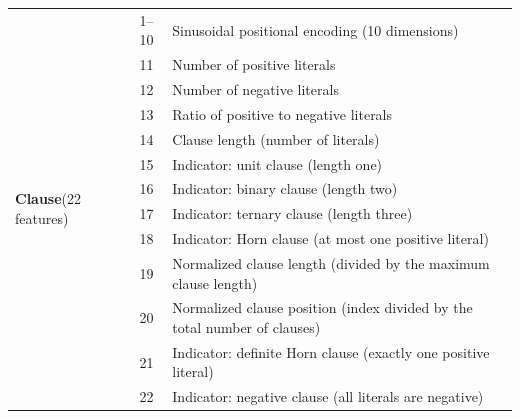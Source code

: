 \begin{table}[htbp]
{\begin{tabular}{@{} p{} c p{} @{}}
			\multirow{13}{=}{\textbf{Clause}\newline(22 features)}
			                   & 1--10         & Sinusoidal positional encoding (10 dimensions)                            \\
			                   & 11            & Number of positive literals                                               \\
			                   & 12            & Number of negative literals                                               \\
			                   & 13            & Ratio of positive to negative literals                                    \\
			                   & 14            & Clause length (number of literals)                                        \\
			                   & 15            & Indicator: unit clause (length one)                                       \\
			                   & 16            & Indicator: binary clause (length two)                                     \\
			                   & 17            & Indicator: ternary clause (length three)                                  \\
			                   & 18            & Indicator: Horn clause (at most one positive literal)                     \\
			                   & 19            & Normalized clause length (divided by the maximum clause length)           \\
			                   & 20            & Normalized clause position (index divided by the total number of clauses) \\
			                   & 21            & Indicator: definite Horn clause (exactly one positive literal)            \\
			                   & 22            & Indicator: negative clause (all literals are negative)                    \\
			\bottomrule
		\end{tabular}}
\end{table}


